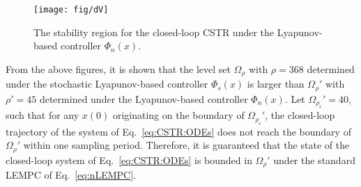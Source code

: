 \documentclass[letterpaper, 10pt, conference]{ieeeconf}
\begin{document}
\begin{figure}[!htbp]
	\centering
	\texttt{[image: fig/dV]}
	\vspace{-8pt}
	\caption{The stability region for the closed-loop CSTR under the Lyapunov-based controller $\Phi_n(x)$.}
	\label{fig:dV}
	\vspace{-6pt}
\end{figure}

From the above figures, it is shown that the level set $\Omega_{\rho}$ with $\rho=368$ determined under the stochastic Lyapunov-based controller $\Phi_s(x)$ is larger than $\Omega_\rho'$ with $\rho'=45$ determined under the Lyapunov-based controller $\Phi_n(x)$. %
 Let $\Omega_{\rho_e}'=40$, such that for any $x(0)$ originating on the boundary of $\Omega_{\rho_e}'$, the closed-loop trajectory of the system of Eq.~\ref{eq:CSTR:ODEs} does not reach the boundary of $\Omega_{\rho}'$ within one sampling period. Therefore, it is guaranteed that the state of the closed-loop system of Eq.~\ref{eq:CSTR:ODEs} is bounded in $\Omega_{\rho}'$ under the standard LEMPC of Eq.~\ref{eq:nLEMPC}.%
 
\end{document}
